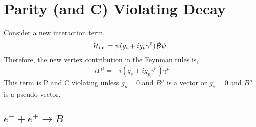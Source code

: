 \documentclass[12pt]{article}
\begin{document}
\section{Parity (and C) Violating Decay}

Consider a new interaction term,
\[ \mathcal{H}_{\text{int}} = \bar{\psi} (g_s + i g_p \gamma^5) \slashed{B} \psi \]
Therefore, the new vertex contribution in the Feynman rules is,
\[ - i \Gamma^\mu = - i (g_s + i g_p \gamma^5) \gamma^\mu  \]
This term is P and C violating unless $g_p = 0$ and $B^\mu$ is a vector or $g_s = 0$ and $B^\mu$ is a pseudo-vector. 

\subsection{$e^- + e^+ \to B$}
\end{document}
